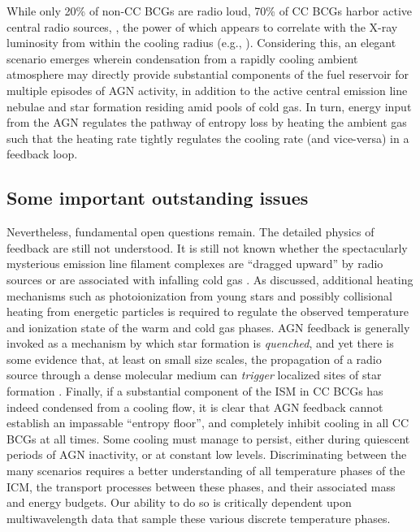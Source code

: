 While only 20\% of non-CC BCGs are radio loud, 70\% of CC BCGs harbor active
central radio sources, \citep{burns90,ball93,mittal09,sun09}, the  power of
which  appears to correlate  with the X-ray  luminosity from  within the
cooling radius (e.g., \citealt{birzan04,mittal09}).  Considering this, an
elegant scenario emerges wherein condensation  from  a  rapidly  cooling
ambient atmosphere may  directly provide substantial components of the fuel
reservoir for multiple  episodes of AGN activity, in addition to  the  active
central  emission  line nebulae  and  star  formation residing  amid pools of
cold gas. In turn, energy input from the AGN regulates the pathway of entropy loss
by heating the ambient gas such that the heating rate tightly regulates the
cooling rate (and vice-versa) in a feedback loop.  


\subsection{Some important outstanding issues}


Nevertheless, fundamental open questions remain. The detailed physics
of feedback are still not understood. It is still not known whether 
the spectacularly mysterious 
emission line filament complexes are ``dragged upward'' by radio sources 
or are associated with infalling cold gas \citep[e.g.,][]{mcdonald10,mcdonald11,fabian11}.  
As discussed, additional heating mechanisms such
as photoionization from young stars and possibly collisional heating from energetic
particles is required to regulate the observed temperature and ionization state
of the warm and cold gas phases. 
AGN feedback is generally invoked as a mechanism by which star formation is {\it quenched}, 
and yet there is some evidence that, at least on small size scales, the propagation 
of a radio source through a dense molecular medium can {\it trigger} localized sites 
of star formation \citep[e.g.,][]{vanbreugel04,odea04}. Finally, 
if a substantial component of the ISM in CC BCGs has indeed condensed from a cooling flow, it is  
clear that AGN feedback cannot 
establish an impassable ``entropy floor'', and 
completely  inhibit cooling in
all  CC BCGs  at all  times. Some cooling must manage to persist, 
either during quiescent periods of AGN inactivity, or at constant low levels.   
Discriminating between the many scenarios requires a better understanding of 
all temperature phases of the ICM, the transport processes between 
these phases, and their associated mass and energy budgets. Our ability to do so 
is critically dependent upon multiwavelength data that sample these various discrete 
temperature phases. 



